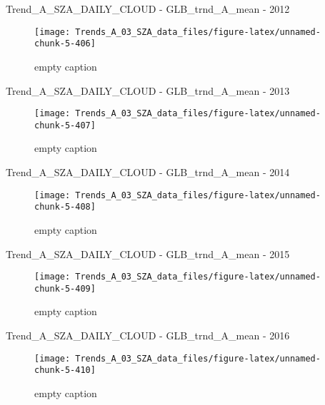 \documentclass[
  10pt,
  a4paper,oneside]{article}
\begin{document}
Trend\_A\_SZA\_DAILY\_CLOUD - GLB\_trnd\_A\_mean - 2012

\begin{figure}[!ht]

{\centering \texttt{[image: Trends\_A\_03\_SZA\_data\_files/figure-latex/unnamed-chunk-5-406]} 

}

\caption{ empty caption }\label{fig:unnamed-chunk-5-406}
\end{figure}

Trend\_A\_SZA\_DAILY\_CLOUD - GLB\_trnd\_A\_mean - 2013

\begin{figure}[!ht]

{\centering \texttt{[image: Trends\_A\_03\_SZA\_data\_files/figure-latex/unnamed-chunk-5-407]} 

}

\caption{ empty caption }\label{fig:unnamed-chunk-5-407}
\end{figure}

Trend\_A\_SZA\_DAILY\_CLOUD - GLB\_trnd\_A\_mean - 2014

\begin{figure}[!ht]

{\centering \texttt{[image: Trends\_A\_03\_SZA\_data\_files/figure-latex/unnamed-chunk-5-408]} 

}

\caption{ empty caption }\label{fig:unnamed-chunk-5-408}
\end{figure}

Trend\_A\_SZA\_DAILY\_CLOUD - GLB\_trnd\_A\_mean - 2015

\begin{figure}[!ht]

{\centering \texttt{[image: Trends\_A\_03\_SZA\_data\_files/figure-latex/unnamed-chunk-5-409]} 

}

\caption{ empty caption }\label{fig:unnamed-chunk-5-409}
\end{figure}

Trend\_A\_SZA\_DAILY\_CLOUD - GLB\_trnd\_A\_mean - 2016

\begin{figure}[!ht]

{\centering \texttt{[image: Trends\_A\_03\_SZA\_data\_files/figure-latex/unnamed-chunk-5-410]} 

}

\caption{ empty caption }\label{fig:unnamed-chunk-5-410}
\end{figure}
\end{document}
